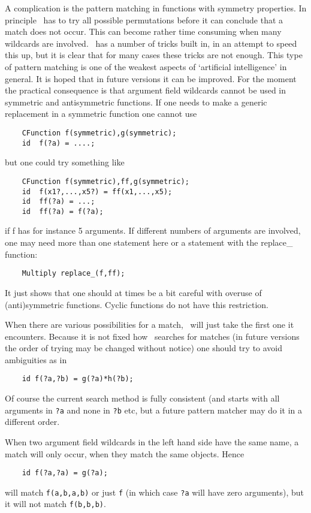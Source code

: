 A complication is the pattern matching in functions with symmetry 
properties. In principle \FORM\ has to try all possible permutations before 
it can conclude that a match does not occur. This can become rather time 
consuming when many wildcards are involved. \FORM\ has a number of tricks 
built in, in an attempt to speed this up, but it is clear that for many 
cases these tricks are not enough. This type of pattern matching is one of 
the weakest aspects of `artificial intelligence' in general. It is hoped 
that in future versions it can be improved. For the moment the practical 
consequence is that argument field wildcards cannot be used in symmetric 
and antisymmetric functions. If one needs to make a generic replacement in 
a symmetric function one cannot use
\begin{verbatim}
    CFunction f(symmetric),g(symmetric);
    id  f(?a) = ....;
\end{verbatim}
but one could try something like
\begin{verbatim}
    CFunction f(symmetric),ff,g(symmetric);
    id  f(x1?,...,x5?) = ff(x1,...,x5);
    id  ff(?a) = ...;
    id  ff(?a) = f(?a);
\end{verbatim}
if f has for instance 5 arguments. If different numbers of arguments are 
involved, one may need more than one statement here or a statement with the 
replace\_ function:
\begin{verbatim}
    Multiply replace_(f,ff);
\end{verbatim}
It just shows that one should at times be a bit careful with overuse of 
(anti)symmetric functions. Cyclic functions do not have this restriction.

When there are various possibilities for a match, \FORM\ will just take the 
first one it encounters. Because it is not fixed how \FORM\ searches for 
matches (in future versions the order of trying may be changed without 
notice) one should try to avoid ambiguities as in
\begin{verbatim}
    id f(?a,?b) = g(?a)*h(?b);
\end{verbatim}
Of course the current search method is fully consistent (and starts with 
all arguments in \verb:?a: and none in \verb:?b: etc, but a future pattern 
matcher may do it in a different order.

When two argument field wildcards in the left hand side have the same name, 
a match will only occur, when they match the same objects. Hence
\begin{verbatim}
    id f(?a,?a) = g(?a);
\end{verbatim}
will match \verb:f(a,b,a,b): or just \verb:f: (in which case \verb:?a: will 
have zero arguments), but it will not match \verb:f(b,b,b):.

